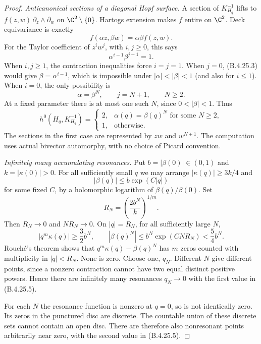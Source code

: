 \begin{proof}
\emph{Anticanonical sections of a diagonal Hopf surface.}
A section of $K_{H_q}^{-1}$ lifts to
$f(z,w)\,\partial_z\wedge\partial_w$ on
$\C^2\setminus\{0\}$. Hartogs extension makes $f$
entire on $\C^2$. Deck equivariance is exactly
\[
 f(\alpha z,\beta w)=\alpha\beta f(z,w).
                                                        \tag{B.4.25.2}
\]
For the Taylor coefficient of $z^i w^j$, with $i,j\ge0$,
this says
\[
 \alpha^{i-1}\beta^{j-1}=1.                             \tag{B.4.25.3}
\]
When $i,j\ge1$, the contraction inequalities force
$i=j=1$. When $j=0$, (B.4.25.3) would give
$\beta=\alpha^{i-1}$, which is impossible under
$|\alpha|<|\beta|<1$ (and also for $i\le1$).
When $i=0$, the only possibility is
\[
 \alpha=\beta^N,\qquad j=N+1,\qquad N\ge2.
                                                        \tag{B.4.25.4}
\]
At a fixed parameter there is at most one such $N$,
since $0<|\beta|<1$. Thus
\[
 h^0(H_q,K_{H_q}^{-1})=
 \begin{cases}
 2,&\alpha(q)=\beta(q)^N\text{ for some }N\ge2,\\
 1,&\text{otherwise}.
 \end{cases}                                           \tag{B.4.25.5}
\]
The sections in the first case are represented by
$zw$ and $w^{N+1}$. The computation uses actual
bivector automorphy, with no choice of Picard convention.

\emph{Infinitely many accumulating resonances.}
Put $b=|\beta(0)|\in(0,1)$ and $k=|\kappa(0)|>0$.
For all sufficiently small $q$ we may arrange
$|\kappa(q)|\ge3k/4$ and
\[
 |\beta(q)|\le b\exp(C|q|)
\]
for some fixed $C$, by a holomorphic logarithm of
$\beta(q)/\beta(0)$. Set
\[
 R_N=\left(\frac{2b^N}{k}\right)^{1/m}.
\]
Then $R_N\to0$ and $N R_N\to0$. On $|q|=R_N$, for
all sufficiently large $N$,
\[
 |q^m\kappa(q)|\ge\frac32 b^N,
 \qquad |\beta(q)^N|\le b^N\exp(CN R_N)<\frac54 b^N.
\]
Rouch\'e's theorem shows that
$q^m\kappa(q)-\beta(q)^N$ has $m$ zeros counted with
multiplicity in $|q|<R_N$. None is zero. Choose one,
$q_N$. Different $N$ give different points, since a
nonzero contraction cannot have two equal distinct
positive powers. Hence there are infinitely many
resonances $q_N\to0$ with the first value in
(B.4.25.5).

For each $N$ the resonance function is nonzero at
$q=0$, so is not identically zero. Its zeros in the
punctured disc are discrete. The countable union of
these discrete sets cannot contain an open disc.
There are therefore also nonresonant points arbitrarily
near zero, with the second value in (B.4.25.5).


\end{proof}
